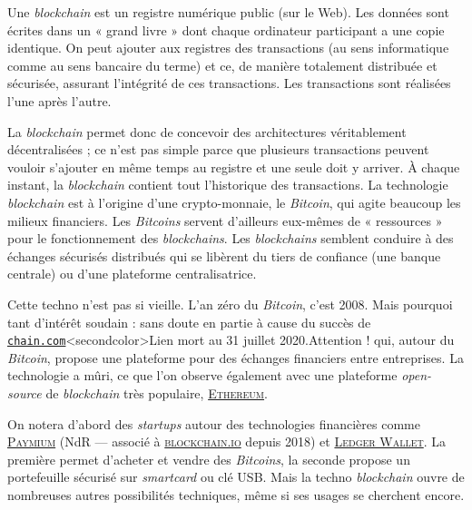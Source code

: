 Une \textit{blockchain} est un registre numérique public (sur le Web). Les données sont écrites dans un « grand livre » dont chaque ordinateur participant a une copie identique. On peut ajouter aux registres des transactions (au sens informatique comme au sens bancaire du terme) et ce, de manière totalement distribuée et sécurisée, assurant  l’intégri\-té de ces transactions. Les transactions sont réalisées l’une après l’autre. 

La \textit{blockchain} permet donc de concevoir des architectures véritablement décentralisées ; ce n’est pas simple parce que plusieurs transactions peuvent vouloir s’ajouter en même temps au registre et une seule doit y arriver. À chaque instant, la \textit{blockchain} contient tout l’historique des transactions. La technologie \textit{blockchain} est à l’origine d’une crypto-monnaie, le \textit{Bitcoin}, qui agite beaucoup les milieux financiers. Les \textit{Bitcoins} servent d’ailleurs eux-mêmes de « ressources » pour le fonctionnement des \textit{blockchains}. Les \textit{blockchains} semblent conduire à des échanges sécurisés distribués qui se libèrent du tiers de confiance (une banque centrale) ou d’une plateforme centralisatrice.

Cette techno n’est pas si vieille. L’an zéro du \textit{Bitcoin}, c’est 2008. Mais pourquoi tant d’intérêt soudain : sans doute en partie à cause du succès de \href{https://www.afternic.com/forsale/chain.com?utm_source=TDFS_DASLNC&utm_medium=DASLNC&utm_campaign=TDFS_DASLNC&traffic_type=TDFS_DASLNC&traffic_id=daslnc&}{\texttt{chain.com}}\caution[t]<secondcolor>{Lien mort au 31 juillet 2020.}{Attention !} qui, autour du \textit{Bitcoin}, propose une plateforme pour des échanges financiers entre entreprises. La technologie a mûri, ce que l’on observe également avec une plateforme \textit{open-source} de \textit{blockchain} très populaire, \href{https://en.wikipedia.org/wiki/Ethereum}{\textsc{Ethereum}}.

On notera d’abord des \textit{startups} autour des technologies financières comme \href{https://www.paymium.com/}{\textsc{Paymium}} (NdR --- associé à \href{https://blockchain.io/}{\textsc{blockchain.io}} depuis 2018) et \href{https://www.ledger.com/}{\textsc{Ledger Wallet}}. La première permet d’acheter et vendre des \textit{Bitcoins}, la seconde propose un portefeuille sécurisé sur \textit{smartcard} ou clé USB. Mais la techno \textit{blockchain} ouvre de nombreuses autres possibilités techniques, même si ses usages se cherchent encore.

